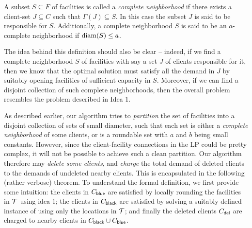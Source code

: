 \begin{definition} \label{def:comp-nbr}
	A subset $S\subseteq F$ of facilities is called a {\em complete neighborhood} if there exists a client-set $J\subseteq C$ such that $\Gamma(J) \subseteq S$.
	In this case the subset $J$ is said to be responsible for $S$. Additionally, a complete neighborhood $S$ is said to be an $a$-complete neighborhood if $\mathrm{diam}(S) \leq a$.
\end{definition}
The idea behind this definition should also be clear -- indeed, if we find a complete neighborhood $S$ of facilities with say a set $J$ of clients responsible for it, then we know that the optimal solution must satisfy all the demand in $J$ by suitably opening facilities of sufficient capacity in $S$. Moreover, if we can find a disjoint collection of such complete neighborhoods, then the overall problem resembles the \cckp problem described in Idea 1.

\medskip \noindent
As described earlier, our algorithm tries to \emph{partition} the set of facilities into a disjoint collection of sets of small diameter, such that each set is either a \emph{complete neighborhood} of some clients, or is a roundable set with $a$ and $b$ being small constants.
However, since the client-facility connections in the LP could be pretty complex, it will not be possible to achieve such a clean partition. Our algorithm therefore may \emph{delete some clients}, and \emph{charge} the total demand of deleted clients to the demands of undeleted nearby clients.
This is encapsulated in the following (rather verbose) theorem. To understand the formal definition, we first provide some intuition: the clients in $C_{\mathsf{blue}}$ are satisfied by locally rounding the facilities in ${\cal T}$ using idea $1$; the clients in $C_{\mathsf{black}}$ are satisfied by solving a suitably-defined instance of \cckp using only the locations in ${\cal T}$; and finally the deleted clients $C_{\mathsf{del}}$ are charged to nearby clients in $C_{\mathsf{black}} \cup C_{\mathsf{blue}}$.

